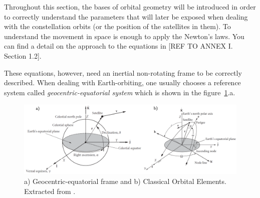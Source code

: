 Throughout this section, the bases of orbital geometry will be introduced in order to correctly understand the parameters that will later be exposed when dealing with the constellation orbits (or the position of the satellites in them). To understand the movement in space is enough to apply the Newton's laws. You can find a detail on the approach to the equations in [{REF TO ANNEX I. Section 1.2}].

These equations, however, need an inertial non-rotating frame to be correctly described. When dealing with Earth-orbiting, one usually chooses a reference system called \textit{geocentric-equatorial system} which is shown in the figure~\ref{fig:eqframe}.a. 

\begin{figure}[H]
\centering
\includegraphics[scale=.28]{./Geometry/fig-Ch1-Geometry/COE&eqframe.png}
\caption{a) Geocentric-equatorial frame and b) Classical Orbital Elements. Extracted from \cite{Howard}.}
\label{fig:eqframe}
\end{figure}

